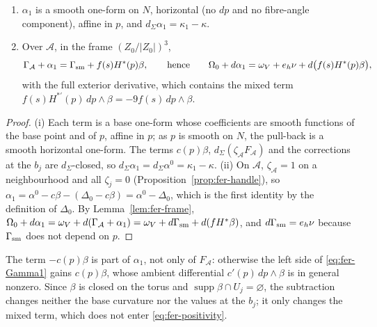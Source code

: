\begin{lemma}\label{lem:fer-alpha1}
\begin{enumerate}[label=(\roman*)]
\item $\alpha_1$ is a smooth one-form on $N$, horizontal (no $dp$ and no fibre-angle component), affine in $p$, and
$d_\Sigma\alpha_1=\kappa_1-\kappa$.
\item Over $\mathcal A$, in the frame $(Z_0/|Z_0|)^3$,
\begin{equation}\label{eq:fer-Gamma1}
 \Gamma_{\mathcal A}+\alpha_1=\Gamma_{\rm sm}+f(s)H^*(p)\beta,\qquad\text{hence}\qquad
 \Omega_0+d\alpha_1=\omega_V+e_h\nu+d\big(f(s)H^*(p)\beta\big),
\end{equation}
with the full exterior derivative, which contains the mixed term $f(s)H^{*\prime}(p)\,dp\wedge\beta=-9f(s)\,dp\wedge\beta$.
\end{enumerate}
\end{lemma}

\begin{proof}
(i) Each term is a base one-form whose coefficients are smooth functions of the base point and of $p$, affine in $p$; as $p$
is smooth on $N$, the pull-back is a smooth horizontal one-form. The terms $c(p)\beta$, $d_\Sigma(\zeta_{\mathcal A}F_{\mathcal A})$ and
the corrections at the $b_j$ are $d_\Sigma$-closed, so $d_\Sigma\alpha_1=d_\Sigma\alpha^0=\kappa_1-\kappa$.
(ii) On $\mathcal A$, $\zeta_{\mathcal A}=1$ on a neighbourhood and all $\zeta_j=0$ (Proposition~\ref{prop:fer-handle}), so
$\alpha_1=\alpha^0-c\beta-(\Delta_0-c\beta)=\alpha^0-\Delta_0$, which is the first identity by the definition of $\Delta_0$. By
Lemma~\ref{lem:fer-frame}, $\Omega_0+d\alpha_1=\omega_V+d(\Gamma_{\mathcal A}+\alpha_1)=\omega_V+d\Gamma_{\rm sm}+d(fH^*\beta)$, and
$d\Gamma_{\rm sm}=e_h\nu$ because $\Gamma_{\rm sm}$ does not depend on $p$.
\end{proof}

\begin{remark}\label{rem:fer-period}
The term $-c(p)\beta$ is part of $\alpha_1$, not only of $F_{\mathcal A}$: otherwise the left side of \eqref{eq:fer-Gamma1} gains
$c(p)\beta$, whose ambient differential $c'(p)\,dp\wedge\beta$ is in general nonzero. Since $\beta$ is closed on the torus and
$\operatorname{supp}\beta\cap U_j=\varnothing$, the subtraction changes neither the base curvature nor the values at the $b_j$; it
only changes the mixed term, which does not enter \eqref{eq:fer-positivity}.
\end{remark}

